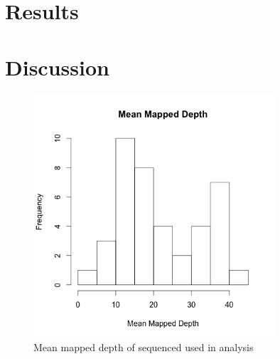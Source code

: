 \documentclass[12pt]{article}
\begin{document}
\begin{center}
\begin{longtable}{lllll}
\end{longtable}
\end{center}






\section*{Results}


\section*{Discussion}

\pagebreak

%
%
%
\pagebreak
\begin{figure}[b]
\centering
   \includegraphics[width=0.8\textwidth]{depthBQ20MQ30.png}
  \caption{Mean mapped depth of sequenced used in analysis}
  \label{fig:depth}
\end{figure}
\end{document}
